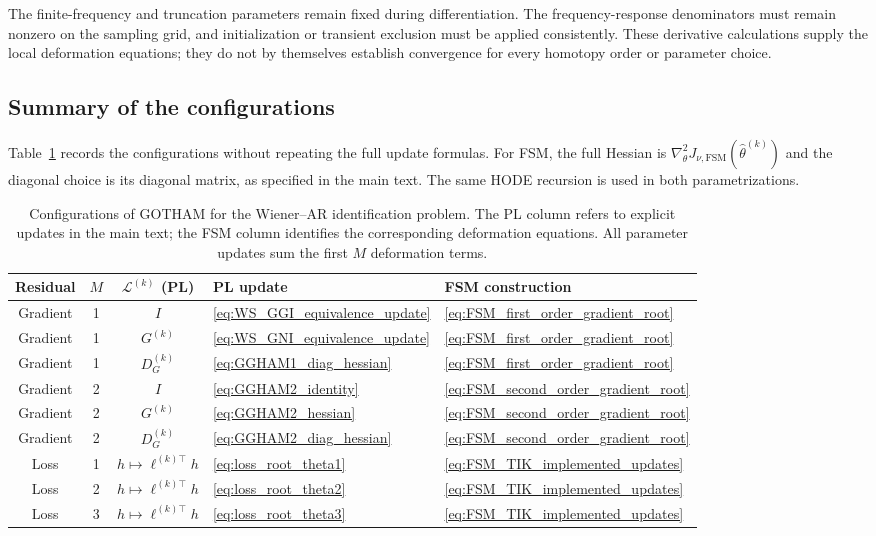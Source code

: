 \documentclass[11pt]{article}
\theoremstyle{remark}
\begin{document}
The finite-frequency and truncation parameters remain fixed during
differentiation. The frequency-response denominators must remain
nonzero on the sampling grid, and initialization or transient
exclusion must be applied consistently. These derivative calculations
supply the local deformation equations; they do not by themselves
establish convergence for every homotopy order or parameter choice.

\subsection{Summary of the configurations}

Table~\ref{tab:GOTHAM_update_rules} records the configurations without
repeating the full update formulas. For FSM, the full Hessian is
$\nabla_\theta^2J_{\nu,\mathrm{FSM}}(\hat\theta^{(k)})$ and the
diagonal choice is its diagonal matrix, as specified in the main text.
The same HODE recursion is used in both parametrizations.

\begin{table}[t]
\centering
\small
\renewcommand{\arraystretch}{1.35}
\setlength{\tabcolsep}{5pt}
\caption{Configurations of GOTHAM for the Wiener--AR identification
problem. The PL column refers to explicit updates in the main text;
the FSM column identifies the corresponding deformation equations.
All parameter updates sum the first $M$ deformation terms.}
\label{tab:GOTHAM_update_rules}
\begin{tabular}{@{}cccll@{}}
\toprule
Residual & $M$ & $\mathcal L^{(k)}$ (PL) & PL update & FSM construction\\
\midrule
Gradient & 1 & $I$ & \eqref{eq:WS_GGI_equivalence_update} & \eqref{eq:FSM_first_order_gradient_root}\\
Gradient & 1 & $G^{(k)}$ & \eqref{eq:WS_GNI_equivalence_update} & \eqref{eq:FSM_first_order_gradient_root}\\
Gradient & 1 & $D_G^{(k)}$ & \eqref{eq:GGHAM1_diag_hessian} & \eqref{eq:FSM_first_order_gradient_root}\\
Gradient & 2 & $I$ & \eqref{eq:GGHAM2_identity} & \eqref{eq:FSM_second_order_gradient_root}\\
Gradient & 2 & $G^{(k)}$ & \eqref{eq:GGHAM2_hessian} & \eqref{eq:FSM_second_order_gradient_root}\\
Gradient & 2 & $D_G^{(k)}$ & \eqref{eq:GGHAM2_diag_hessian} & \eqref{eq:FSM_second_order_gradient_root}\\
\midrule
Loss & 1 & $h\mapsto\ell^{(k)\top}h$ & \eqref{eq:loss_root_theta1} & \eqref{eq:FSM_TIK_implemented_updates}\\
Loss & 2 & $h\mapsto\ell^{(k)\top}h$ & \eqref{eq:loss_root_theta2} & \eqref{eq:FSM_TIK_implemented_updates}\\
Loss & 3 & $h\mapsto\ell^{(k)\top}h$ & \eqref{eq:loss_root_theta3} & \eqref{eq:FSM_TIK_implemented_updates}\\
\bottomrule
\end{tabular}
\end{table}
\end{document}

